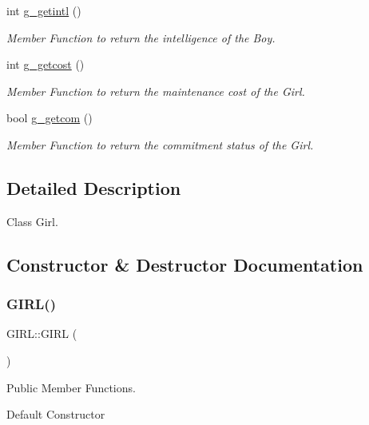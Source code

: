 \begin{DoxyCompactItemize}
int \hyperlink{class_g_i_r_l_a297a2aae3f49b18d1dec20de8fbd6fd4}{g\+\_\+getintl} ()
\begin{DoxyCompactList}\small\item\em Member Function to return the intelligence of the Boy. \end{DoxyCompactList}\item 
int \hyperlink{class_g_i_r_l_a2c1db89bcec0cbc299a562578a9eb095}{g\+\_\+getcost} ()
\begin{DoxyCompactList}\small\item\em Member Function to return the maintenance cost of the Girl. \end{DoxyCompactList}\item 
bool \hyperlink{class_g_i_r_l_a66f1cbdcb7d90355a2ff15234b2d8a43}{g\+\_\+getcom} ()
\begin{DoxyCompactList}\small\item\em Member Function to return the commitment status of the Girl. \end{DoxyCompactList}\end{DoxyCompactItemize}


\subsection{Detailed Description}
Class Girl. 

\subsection{Constructor \& Destructor Documentation}
\mbox{\label{class_g_i_r_l_aa465848c85b774d18f587c83ea4c0c1f}} 
\subsubsection{\texorpdfstring{G\+I\+R\+L()}{GIRL()}\hspace{0.1cm}{\footnotesize\ttfamily [1/2]}}
{\footnotesize\ttfamily G\+I\+R\+L\+::\+G\+I\+RL (\begin{DoxyParamCaption}{ }\end{DoxyParamCaption})\hspace{0.3cm}{\ttfamily [inline]}}



Public Member Functions. 

Default Constructor \mbox{\label{class_g_i_r_l_a9389bd302224c1493537238b1c7af22e}} 
